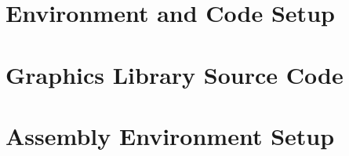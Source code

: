 \label{epilogue}


\appendix
\chapter{Environment and Code Setup}
\label{appendix-project-setup}


\chapter{Graphics Library Source Code}
\label{appendix-gfx-library}


\chapter{Assembly Environment Setup}
\label{appendix-asm-setup}


\backmatter

\footnotesize


\nocite{*}
\printindex
